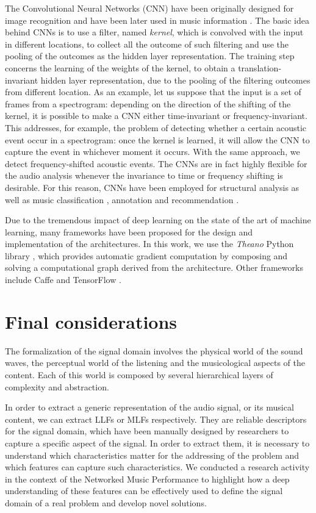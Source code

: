 The Convolutional Neural Networks (CNN) have been originally designed for image recognition and have been later used in music information \cite{lee2009convolutional}. The basic idea behind CNNs is to use a filter, named \textit{kernel}, which is convolved with the input in different locations, to collect all the outcome of such filtering and use the pooling of the outcomes as the hidden layer representation. The training step concerns the learning of the weights of the kernel, to obtain a translation-invariant hidden layer representation, due to the pooling of the filtering outcomes from different location. As an example, let us suppose that the input is a set of frames from a spectrogram: depending on the direction of the shifting of the kernel, it is possible to make a CNN either time-invariant or frequency-invariant. This addresses, for example, the problem of detecting whether a certain acoustic event occur in a spectrogram: once the kernel is learned, it will allow the CNN to capture the event in whichever moment it occurs. With the same approach, we detect frequency-shifted acoustic events. The CNNs are in fact highly flexible for the audio analysis whenever the invariance to time or frequency shifting is desirable. For this reason, CNNs have been employed for structural analysis \cite{ullrich2014boundary} as well as music classification \cite{dieleman2011audio}, annotation \cite{dieleman2014end} and recommendation \cite{van2013deep}.

Due to the tremendous impact of  deep learning on the state of the art of machine learning, many frameworks have been proposed for the design and implementation of the architectures. In this work, we use the \textit{Theano} Python library \cite{Bergstra2010}, which provides automatic gradient computation by composing and solving a computational graph derived from the architecture. Other frameworks include Caffe \cite{jia2014caffe} and TensorFlow \cite{tensorflow}.

\section{Final considerations}
The formalization of the signal domain involves the physical world of the sound waves, the perceptual world of the listening and the musicological aspects of the content. Each of this world is composed by several hierarchical layers of complexity and abstraction.

In order to extract a generic representation of the audio signal, or its musical content, we can extract LLFs or MLFs respectively. They are reliable descriptors for the signal domain, which have been manually designed by researchers to capture a specific aspect of the signal. In order to extract them, it is necessary to understand which characteristics matter for the addressing of the problem and which features can capture such characteristics. We conducted a research activity in the context of the Networked Music Performance to highlight how a deep understanding of these features can be effectively used to define the signal domain of a real problem and develop novel solutions.

